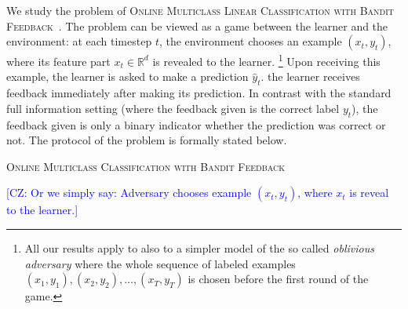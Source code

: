 \documentclass[12pt]{article}
\newcommand{\R}{\mathbb{R}}  %
\newcommand{\kibitz}[2]{{\textcolor{#1}{\textsf{\footnotesize #2}}}}
\newcommand{\chicheng}[1]{\kibitz{blue}{[CZ: #1]}}
\begin{document}
We study the problem of \textsc{Online Multiclass Linear
Classification with Bandit Feedback}~\cite{Kakade-Shalev-Shwartz-Tewari-2008}.
The problem can be viewed as a game between the learner and the environment:
at each timestep $t$, the environment chooses an example $(x_t, y_t)$, where its feature
part $x_t \in \R^d$ is revealed to the learner.
\footnote{All our results apply to also to a simpler model of
the so called \emph{oblivious adversary} where the whole sequence of labeled
examples $(x_1, y_1), (x_2, y_2), \dots, (x_T, y_T)$ is chosen before the first
round of the game.}
Upon receiving this example, the
learner is asked to make a prediction $\hat{y}_t$.
the learner receives feedback immediately after making its prediction.
In contrast with the standard full information setting (where the feedback given is the correct label $y_t$), the feedback given is only a binary indicator
whether the prediction was correct or not. The protocol of the problem is formally stated below.




\begin{algorithm}[h]
\caption{\textsc{Online Multiclass Classification with Bandit Feedback}
\label{algorithm:game-protocol}}
\begin{algorithmic}[1]
{
\chicheng{Or we simply say: Adversary chooses example $(x_t, y_t)$, where $x_t$ is reveal to the learner.}
\ENDFOR
}
\end{algorithmic}
\end{algorithm}
\end{document}

